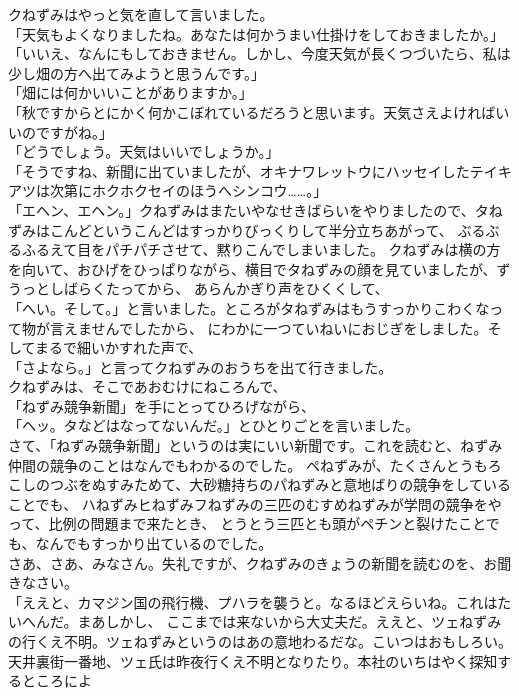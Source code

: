 \documentclass[
    a4paper,
    10pt,
    book]
    {tarticle}
\begin{document}
\indent クねずみはやっと気を直して言いました。\\
「天気もよくなりましたね。あなたは何かうまい仕掛けをしておきましたか。」\\
「いいえ、なんにもしておきません。しかし、今度天気が長くつづいたら、私は少し畑の方へ出てみようと思うんです。」\\
「畑には何かいいことがありますか。」\\
「秋ですからとにかく何かこぼれているだろうと思います。天気さえよければいいのですがね。」\\
「どうでしょう。天気はいいでしょうか。」\\
「そうですね、新聞に出ていましたが、オキナワレットウにハッセイしたテイキアツは次第にホクホクセイのほうへシンコウ……。」\\
「エヘン、エヘン。」クねずみはまたいやなせきばらいをやりましたので、タねずみはこんどというこんどはすっかりびっくりして半分立ちあがって、
ぶるぶるふるえて目をパチパチさせて、黙りこんでしまいました。
\newpage
\thispagestyle{fancy}
\fancyhead[R]{\empty}
\indent クねずみは横の方を向いて、おひげをひっぱりながら、横目でタねずみの顔を見ていましたが、ずうっとしばらくたってから、
あらんかぎり声をひくくして、\\
「へい。そして。」と言いました。ところがタねずみはもうすっかりこわくなって物が言えませんでしたから、
にわかに一つていねいにおじぎをしました。そしてまるで細いかすれた声で、\\
「さよなら。」と言ってクねずみのおうちを出て行きました。\\
\indent クねずみは、そこであおむけにねころんで、\\
「ねずみ競争新聞」を手にとってひろげながら、\\
「ヘッ。タなどはなってないんだ。」とひとりごとを言いました。\\
\indent さて、「ねずみ競争新聞」というのは実にいい新聞です。これを読むと、ねずみ仲間の競争のことはなんでもわかるのでした。
ペねずみが、たくさんとうもろこしのつぶをぬすみためて、大砂糖持ちのパねずみと意地ばりの競争をしていることでも、
ハねずみヒねずみフねずみの三匹のむすめねずみが学問の競争をやって、比例の問題まで来たとき、
とうとう三匹とも頭がペチンと裂けたことでも、なんでもすっかり出ているのでした。\\
\indent さあ、さあ、みなさん。失礼ですが、クねずみのきょうの新聞を読むのを、お聞きなさい。\\
「ええと、カマジン国の飛行機、プハラを襲うと。なるほどえらいね。これはたいへんだ。まあしかし、
ここまでは来ないから大丈夫だ。ええと、ツェねずみの行くえ不明。ツェねずみというのはあの意地わるだな。こいつはおもしろい。\\
\indent 天井裏街一番地、ツェ氏は昨夜行くえ不明となりたり。本社のいちはやく探知するところによ
\end{document}
